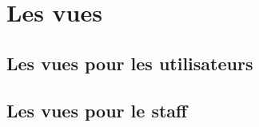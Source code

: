 \part{Les vues}

\chapter{Les vues pour les utilisateurs}











\chapter{Les vues pour le staff}
